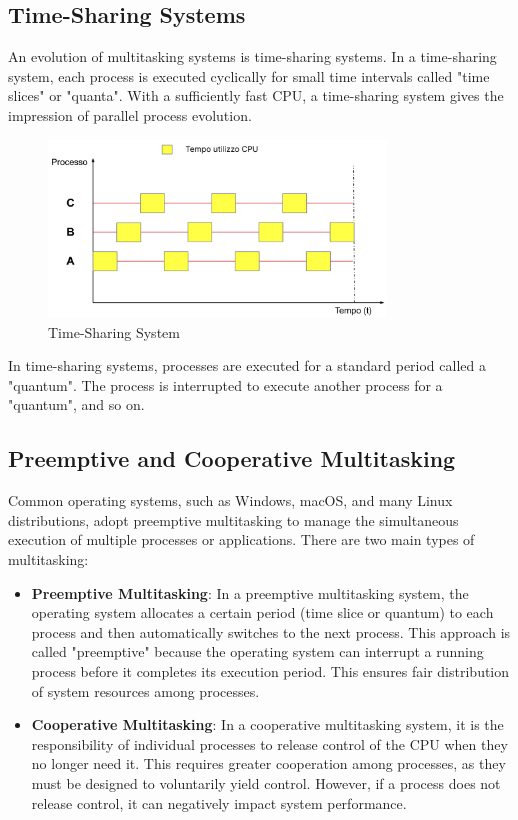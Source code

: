 \subsection{Time-Sharing Systems}
An evolution of multitasking systems is time-sharing systems. In a time-sharing system, each process is executed cyclically for small time intervals called "time slices" or "quanta". With a sufficiently fast CPU, a time-sharing system gives the impression of parallel process evolution.

\begin{figure}[h]
    \centering
    \includegraphics[width=0.8\textwidth]{images/timeshare.png}
    \caption{Time-Sharing System}
    \label{fig:time_sharing}
\end{figure}

In time-sharing systems, processes are executed for a standard period called a "quantum". The process is interrupted to execute another process for a "quantum", and so on.

\subsection{Preemptive and Cooperative Multitasking}
Common operating systems, such as Windows, macOS, and many Linux distributions, adopt preemptive multitasking to manage the simultaneous execution of multiple processes or applications. There are two main types of multitasking:

\begin{itemize}
    \item \textbf{Preemptive Multitasking}: In a preemptive multitasking system, the operating system allocates a certain period (time slice or quantum) to each process and then automatically switches to the next process. This approach is called "preemptive" because the operating system can interrupt a running process before it completes its execution period. This ensures fair distribution of system resources among processes.
    \item \textbf{Cooperative Multitasking}: In a cooperative multitasking system, it is the responsibility of individual processes to release control of the CPU when they no longer need it. This requires greater cooperation among processes, as they must be designed to voluntarily yield control. However, if a process does not release control, it can negatively impact system performance.
\end{itemize}

